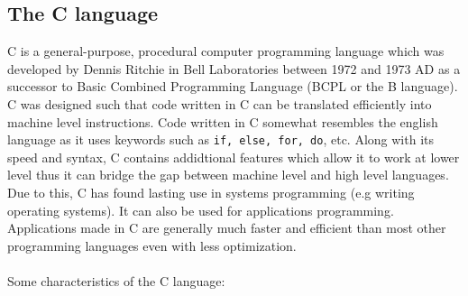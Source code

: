 \documentclass[report.tex]{subfiles}
\begin{document}
    \subsection{The C language}
    C is a general-purpose, procedural computer programming language which was developed by Dennis Ritchie in Bell Laboratories between 1972 and 1973 AD as a successor to Basic Combined Programming Language (BCPL or the B language).
    C was designed such that code written in C can be translated efficiently into machine level instructions. 
    Code written in C somewhat resembles the english language as it uses keywords such as \texttt{if, else, for, do}, etc.
    Along with its speed and syntax, C contains addidtional features which allow it to work at lower level thus it can bridge the gap between machine level and high level languages.
    Due to this, C has found lasting use in systems programming (e.g writing operating systems). 
    It can also be used for applications programming. Applications made in C are generally much faster and efficient than most other programming languages even with less optimization.
    \\\\
    Some characteristics of the C language:
\end{document}
